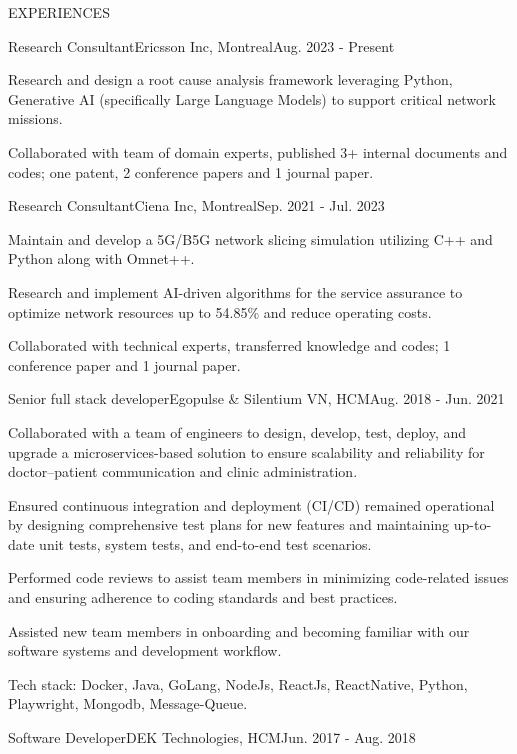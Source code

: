 \documentclass{resume} %
\begin{document}
\begin{rSection}{EXPERIENCES}
  \begin{rWork}{Research Consultant}{Ericsson Inc, Montreal}{Aug. 2023 - Present}
    \item Research and design a root cause analysis framework leveraging Python, Generative AI (specifically Large Language Models) to support critical network missions.
    \item Collaborated with team of domain experts, published 3+ internal documents and codes; one patent, 2 conference papers and 1 journal paper.
  \end{rWork}
  \begin{rWork}{Research Consultant}{Ciena Inc, Montreal}{Sep. 2021 - Jul. 2023}
    \item Maintain and develop a 5G/B5G network slicing simulation utilizing C++ and Python along with Omnet++.
    \item Research and implement AI-driven algorithms for the service assurance to optimize network resources up to 54.85\% and reduce operating costs.
    \item Collaborated with technical experts, transferred knowledge and codes; 1 conference paper and 1 journal paper.
  \end{rWork}
  \begin{rWork}{Senior full stack developer}{Egopulse \& Silentium VN, HCM}{Aug. 2018 - Jun. 2021}
    \item  Collaborated with a team of engineers to design, develop, test, deploy, and upgrade a microservices-based solution to ensure scalability and reliability for doctor–patient communication and clinic administration.
    \item Ensured continuous integration and deployment (CI/CD) remained operational by designing comprehensive test plans for new features and maintaining up-to-date unit tests, system tests, and end-to-end test scenarios.
    \item Performed code reviews to assist team members in minimizing code-related issues and ensuring adherence to coding standards and best practices.
    \item Assisted new team members in onboarding and becoming familiar with our software systems and development workflow.
    \item Tech stack: Docker, Java, GoLang, NodeJs, ReactJs, ReactNative, Python, Playwright, Mongodb, Message-Queue.
  \end{rWork}
  \begin{rWork}{Software Developer}{DEK Technologies, HCM}{Jun. 2017 - Aug. 2018}

\end{rWork}
\end{rSection}
\end{document}

